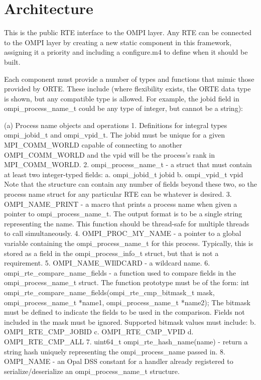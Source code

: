 \section{Architecture}
\label{sec:architecture}

\iffalse
 This is the public RTE interface to the OMPI layer. Any RTE can be
 connected to the OMPI layer by creating a new static component in
 this framework, assigning it a priority and including a configure.m4
 to define when it should be built.

 Each component must provide a number of types and functions that mimic
 those provided by ORTE. These include (where flexibility exists, the
 ORTE data type is shown, but any compatible type is allowed. For example,
 the jobid field in ompi_process_name_t could be any type of integer, but
 cannot be a string):

 (a) Process name objects and operations
     1. Definitions for integral types ompi_jobid_t and ompi_vpid_t.
        The jobid must be unique for a given MPI_COMM_WORLD capable of
        connecting to another OMPI_COMM_WORLD and the vpid will be the
        process's rank in MPI_COMM_WORLD.
     2. ompi_process_name_t - a struct that must contain at least two integer-typed fields:
           a. ompi_jobid_t jobid
           b. ompi_vpid_t vpid
        Note that the structure can contain any number of fields beyond these
        two, so the process name struct for any particular RTE can be whatever
        is desired.
     3. OMPI_NAME_PRINT - a macro that prints a process name when given
        a pointer to ompi_process_name_t. The output format is to be
        a single string representing the name.  This function should
        be thread-safe for multiple threads to call simultaneously.
     4. OMPI_PROC_MY_NAME - a pointer to a global variable containing
        the ompi_process_name_t for this process. Typically, this is
        stored as a field in the ompi_process_info_t struct, but that
        is not a requirement.
     5. OMPI_NAME_WIlDCARD - a wildcard name.
     6. ompi_rte_compare_name_fields - a function used to compare fields
        in the ompi_process_name_t struct. The function prototype must be
        of the form:
        int ompi_rte_compare_name_fields(ompi_rte_cmp_bitmask_t mask,
                                         ompi_process_name_t *name1,
                                         ompi_process_name_t *name2);
        The bitmask must be defined to indicate the fields to be used
        in the comparison. Fields not included in the mask must be ignored.
        Supported bitmask values must include:
           b. OMPI_RTE_CMP_JOBID
           c. OMPI_RTE_CMP_VPID
           d. OMPI_RTE_CMP_ALL
      7. uint64_t ompi_rte_hash_name(name) - return a string hash uniquely
         representing the ompi_process_name passed in.
      8. OMPI_NAME - an Opal DSS constant for a handler already registered
         to serialize/deserialize an ompi_process_name_t structure.

